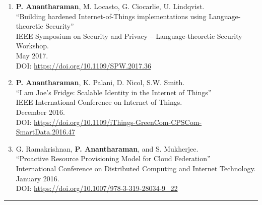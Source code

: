 \documentclass[letterpaper,10pt]{article}
\begin{document}
\begin{enumerate}[label={C\arabic*.}]
\item {\bf P. Anantharaman}, M. Locasto, G. Ciocarlie, U. Lindqvist.\\
  ``Building hardened Internet-of-Things implementations using Language-theoretic Security''\\
  IEEE Symposium on Security and Privacy -- Language-theoretic Security Workshop.\\
  May 2017.\\
  DOI: \url{https://doi.org/10.1109/SPW.2017.36}
\item {\bf P. Anantharaman}, K. Palani, D. Nicol, S.W. Smith.\\
  ``I am Joe's Fridge: Scalable Identity in the Internet of Things''\\
  IEEE International Conference on Internet of Things.\\
  December 2016.\\
  DOI: \url{https://doi.org/10.1109/iThings-GreenCom-CPSCom-SmartData.2016.47}
\item G. Ramakrishnan, {\bf P. Anantharaman}, and S. Mukherjee.\\
  ``Proactive Resource Provisioning Model for Cloud Federation''\\
  International Conference on Distributed Computing and Internet Technology.\\
  January 2016.\\
  DOI: \url{https://doi.org/10.1007/978-3-319-28034-9\_22}
  \end{enumerate}

\hrule

\end{document}
